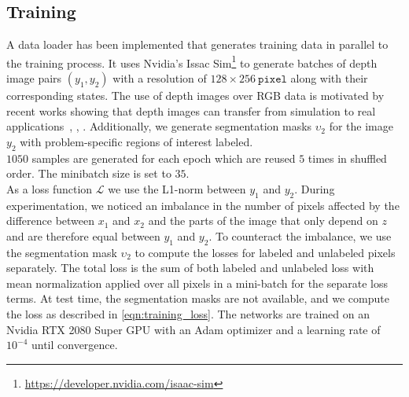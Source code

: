\documentclass[letterpaper, 10 pt, journal, twoside]{ieeetran}  %
\begin{document}
\subsection{Training}
\label{sec:implementation_training}
A data loader has been implemented that generates training data in parallel to the training process. It uses Nvidia's Issac Sim\footnote{\url{https://developer.nvidia.com/isaac-sim}} to generate batches of depth image pairs $(y_1, y_2)$ with a resolution of $128\times256 ~ \texttt{pixel}$ along with their corresponding states.
The use of depth images over RGB data is motivated by recent works showing that depth images can transfer from simulation to real applications~\cite{danielczuk2019segmenting}, \cite{buch2017prediction}, \cite{wan2017crossing}.
Additionally, we generate segmentation masks $\upsilon_2$ for the image $y_2$ with problem-specific regions of interest labeled.\\
$1050$ samples are generated for each epoch which are reused $5$ times in shuffled order. The minibatch size is set to $35$.\\
As a loss function $\mathcal{L}$ we use the L1-norm between $y_1$ and $y_2$.
During experimentation, we noticed an imbalance in the number of pixels affected by the difference between $x_1$ and $x_2$ and the parts of the image that only depend on $z$ and are therefore equal between $y_1$ and $y_2$. To counteract the imbalance, we use the segmentation mask $\upsilon_2$ to compute the losses for labeled and unlabeled pixels separately. The total loss is the sum of both labeled and unlabeled loss with mean normalization applied over all pixels in a mini-batch for the separate loss terms. At test time, the segmentation masks are not available, and we compute the loss as described in \eqref{eqn:training_loss}.
The networks are trained on an Nvidia RTX 2080 Super GPU with an Adam optimizer \cite{ADAM2015} and a learning rate of $10^{-4}$ until convergence.
\end{document}
